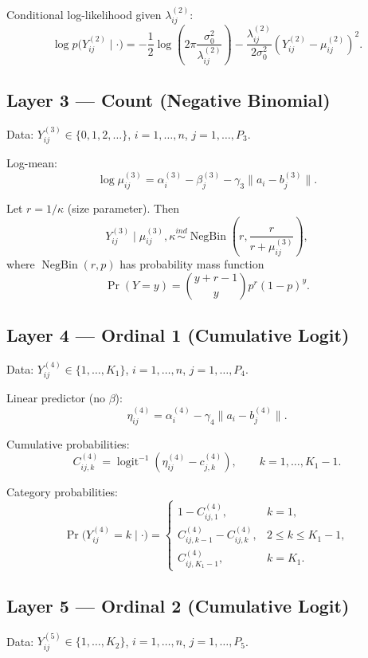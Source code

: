\documentclass[11pt]{article}
\begin{document}
Conditional log-likelihood given $\lambda_{ij}^{(2)}$:
\[
\log p\bigl(Y_{ij}^{(2)} \mid \cdot\bigr)
=
-\frac{1}{2}\log\left(2\pi \frac{\sigma_0^2}{\lambda_{ij}^{(2)}}\right)
-
\frac{\lambda_{ij}^{(2)}}{2\sigma_0^2}\left(Y_{ij}^{(2)}-\mu_{ij}^{(2)}\right)^2.
\]

\subsection{Layer 3 --- Count (Negative Binomial)}

Data: $Y_{ij}^{(3)} \in \{0,1,2,\dots\}$, $i=1,\dots,n$, $j=1,\dots,P_3$.

Log-mean:
\[
\log \mu_{ij}^{(3)} = \alpha_i^{(3)} - \beta_j^{(3)} - \gamma_3\|a_i - b_j^{(3)}\|.
\]

Let $r=1/\kappa$ (size parameter). Then
\[
Y_{ij}^{(3)} \mid \mu_{ij}^{(3)},\kappa
\overset{ind}{\sim}
\operatorname{NegBin}\left(r, \frac{r}{r+\mu_{ij}^{(3)}}\right),
\]
where $\operatorname{NegBin}(r,p)$ has probability mass function
\[
\Pr(Y=y)=\binom{y+r-1}{y}p^r(1-p)^y.
\]

\subsection{Layer 4 --- Ordinal 1 (Cumulative Logit)}

Data: $Y_{ij}^{(4)} \in \{1,\dots,K_1\}$, $i=1,\dots,n$, $j=1,\dots,P_4$.

Linear predictor (no $\beta$):
\[
\eta_{ij}^{(4)} = \alpha_i^{(4)} - \gamma_4\|a_i - b_j^{(4)}\|.
\]

Cumulative probabilities:
\[
C_{ij,k}^{(4)} = \operatorname{logit}^{-1}\!\left(\eta_{ij}^{(4)} - c_{j,k}^{(4)}\right),
\qquad k=1,\dots,K_1-1.
\]

Category probabilities:
\[
\Pr\bigl(Y_{ij}^{(4)}=k\mid \cdot\bigr)=
\begin{cases}
1-C_{ij,1}^{(4)}, & k=1,\\
C_{ij,k-1}^{(4)}-C_{ij,k}^{(4)}, & 2\le k\le K_1-1,\\
C_{ij,K_1-1}^{(4)}, & k=K_1.
\end{cases}
\]

\subsection{Layer 5 --- Ordinal 2 (Cumulative Logit)}

Data: $Y_{ij}^{(5)} \in \{1,\dots,K_2\}$, $i=1,\dots,n$, $j=1,\dots,P_5$.
\end{document}
